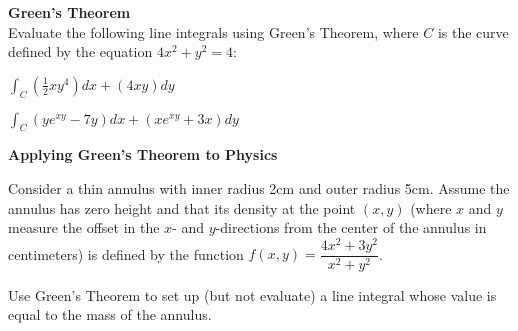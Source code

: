 \item
\textbf{Green's Theorem} \\
Evaluate the following line integrals using Green's Theorem, where $C$ is the
curve defined by the equation $4x^2 + y^2 = 4$:

\BEN
\item $\int_C \! (\frac{1}{2}xy^4)dx + (4xy)dy \,$
\item $\int_C \! (ye^{xy} - 7y) dx + (xe^{xy} + 3x) dy \,$
\EEN

\item
\textbf{Applying Green's Theorem to Physics}

Consider a thin annulus with inner radius 2cm and outer radius 5cm.  Assume the
annulus has zero height and that its density at the point $(x,y)$ (where $x$
and $y$ measure the offset in the $x$- and $y$-directions from the center of
the annulus in centimeters) is defined by the function $f(x,y) = \dfrac{4x^2 +
3y^2}{x^2 + y^2}$.

Use Green's Theorem to set up (but not evaluate) a line integral whose value is
equal to the mass of the annulus.

\EEN
